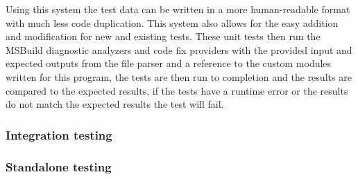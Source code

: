 Using this system the test data can be written in a more human-readable format with much less code duplication. This system also allows for the easy addition and modification for new and existing tests. These unit tests then run the MSBuild diagnostic analyzers and code fix providers with the provided input and expected outputs from the file parser and a reference to the custom modules written for this program, the tests are then run to completion and the results are compared to the expected results, if the tests have a runtime error or the results do not match the expected results the test will fail.


\subsubsection{Integration testing}


\subsubsection{Standalone testing}
